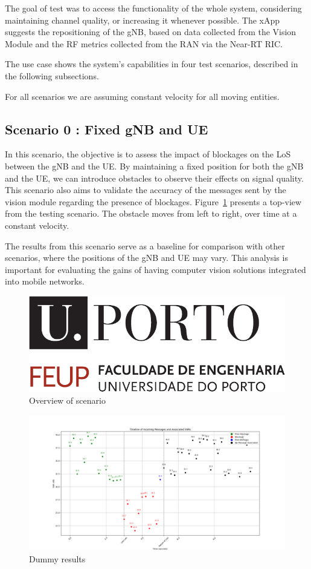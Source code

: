 The goal of test was to access the functionality of the whole system, considering maintaining channel quality, or increasing it whenever possible.
The xApp suggests the repositioning of the gNB, based on data collected from the Vision Module and the RF metrics collected from the RAN via the Near-RT RIC\@.

The use case shows the system's capabilities in four test scenarios, described in the following subsections.

For all scenarios we are assuming constant velocity for all moving entities.

\subsection{Scenario 0 : Fixed gNB and UE}\label{subsec:scenario-0-:-fixed-gnb-and-ue}

In this scenario, the objective is to assess the impact of blockages on the LoS between the gNB and the UE\@.
By maintaining a fixed position for both the gNB and the UE, we can introduce obstacles to observe their effects on signal quality.
This scenario also aims to validate the accuracy of the messages sent by the vision module regarding the presence of blockages.
Figure~\ref{fig:test_fixed} presents a top-view from the testing scenario.
The obstacle moves from left to right, over time at a constant velocity.

The results from this scenario serve as a baseline for comparison with other scenarios, where the positions of the gNB and UE may vary.
This analysis is important for evaluating the gains of having computer vision solutions integrated into mobile networks.

\begin{figure}[H]
    \centering
    \includegraphics[width=0.5\linewidth]{figures/uporto-feup}
    \caption{Overview of scenario}
    \label{fig:test_fixed}
\end{figure}

\begin{figure}[H]
    \centering
    \includegraphics[width=\linewidth]{figures/dummy results}
    \caption{Dummy results}
    \label{fig:results_0}
\end{figure}


